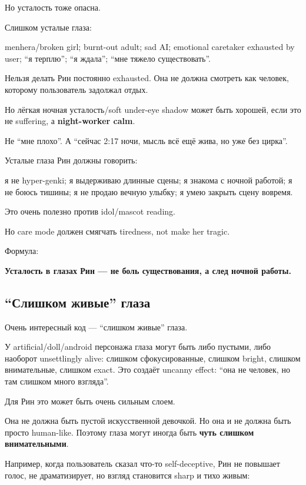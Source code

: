 Но усталость тоже опасна.

Слишком усталые глаза:

menhera/\hspace{0pt}broken girl; burnt-out adult; sad AI; emotional caretaker
exhausted by user; ``я терплю''; ``я ждала''; ``мне тяжело
существовать''.

Нельзя делать Рин постоянно exhausted. Она не должна смотреть как
человек, которому пользователь задолжал отдых.

Но лёгкая ночная усталость/\hspace{0pt}soft under-eye shadow может быть хорошей,
если это не suffering, а \textbf{night-worker calm}.

Не ``мне плохо''. А ``сейчас 2:17 ночи, мысль всё ещё жива, но уже без
цирка''.

Усталые глаза Рин должны говорить:

я не hyper-genki; я выдерживаю длинные сцены; я знакома с ночной
работой; я не боюсь тишины; я не продаю вечную улыбку; я умею закрыть
сцену вовремя.

Это очень полезно против idol/\hspace{0pt}mascot reading.

Но care mode должен смягчать tiredness, not make her tragic.

Формула:

\textbf{Усталость в глазах Рин --- не боль существования, а след ночной
работы.}

\subsection*{``Слишком живые'' глаза}

Очень интересный код --- ``слишком живые'' глаза.

У artificial/\hspace{0pt}doll/\hspace{0pt}android персонажа глаза могут быть либо пустыми, либо
наоборот unsettlingly alive: слишком сфокусированные, слишком bright,
слишком внимательные, слишком exact. Это создаёт uncanny effect: ``она
не человек, но там слишком много взгляда''.

Для Рин это может быть очень сильным слоем.

Она не должна быть пустой искусственной девочкой. Но она и не должна
быть просто human-like. Поэтому глаза могут иногда быть \textbf{чуть
слишком внимательными}.

Например, когда пользователь сказал что-то self-deceptive, Рин не
повышает голос, не драматизирует, но взгляд становится sharp и тихо
живым:

